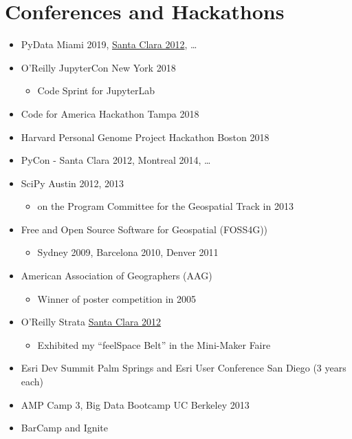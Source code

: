 \documentclass[12pt]{article}
\newenvironment{mitemize}
               {%
                 \setlength{\parskip}{3pt}
                 \setlength{\itemsep}{2.5pt plus 1pt}
                 \begin{itemize}}
               {\end{itemize}}
\begin{document}
\section*{Conferences and Hackathons} \hfill

\begin{mitemize}
\item PyData Miami 2019, \href{https://conferences.oreilly.com/strata/strata2012/public/schedule/detail/23166}{Santa Clara 2012}, \ldots
\item O'Reilly JupyterCon New York 2018
  \begin{mitemize}
  \item Code Sprint for JupyterLab
  \end{mitemize}
  \item Code for America Hackathon Tampa 2018
  \item Harvard Personal Genome Project Hackathon Boston 2018
  \item PyCon - Santa Clara 2012, Montreal 2014, \ldots
  \item SciPy Austin 2012, 2013
    \begin{mitemize}
    \item on the Program Committee for the Geospatial Track in 2013
    \end{mitemize}
  \item Free and Open Source Software for Geospatial (FOSS4G))
    \begin{mitemize}
    \item Sydney 2009, Barcelona 2010, Denver 2011
    \end{mitemize}
  \item American Association of Geographers (AAG)
    \begin{mitemize}
    \item Winner of poster competition in 2005
    \end{mitemize}
  \item O'Reilly Strata \href{https://conferences.oreilly.com/strata/strata2012}{Santa Clara 2012}
    \begin{mitemize}
    \item Exhibited my ``feelSpace Belt'' in the Mini-Maker Faire
    \end{mitemize}
  \item Esri Dev Summit Palm Springs and Esri User Conference San Diego (3 years each)
  \item AMP Camp 3, Big Data Bootcamp UC Berkeley 2013
  \item BarCamp and Ignite

\end{mitemize}
\end{document}
